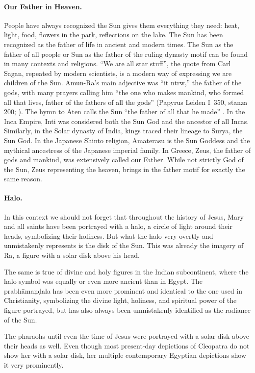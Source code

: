\paragraph{Our Father in Heaven.}
People have always recognized the Sun gives them everything they need: heat, light, food, flowers in the park, reflections on the lake.
The Sun has been recognized as the father of life in ancient and modern times.
The Sun as the father of all people or Sun as the father of the ruling dynasty motif can be found in many contexts and religions.
``We are all star stuff'', the quote from Carl Sagan, repeated by modern scientists, is a modern way of expressing we are children of the Sun.
Amun-Ra's main adjective was ``it nṯrw,'' the father of the gods, with many prayers calling him ``the one who makes mankind, who formed all that lives, father of the fathers of all the gods'' (Papyrus Leiden I~350, stanza 200; \cite{assmann:searchgod}).
The hymn to Aten calls the Sun ``the father of all that he made'' \cite{hymn:aten}.
In the Inca Empire, Inti was considered both the Sun God and the ancestor of all Incas.
Similarly, in the Solar dynasty of India, kings traced their lineage to Surya, the Sun God.
In the Japanese Shinto religion, Amaterasu is the Sun Goddess and the mythical ancestress of the Japanese imperial family.
In Greece, Zeus, the father of gods and mankind, was extensively called our Father.
While not strictly God of the Sun, Zeus representing the heaven, brings in the father motif for exactly the same reason.

\paragraph{Halo.}
In this context we should not forget that throughout the history of Jesus, Mary and all saints have been portrayed with a halo, a circle of light around their heads, symbolizing their holiness.
But what the halo very overtly and unmistakenly represents is the disk of the Sun.
This was already the imagery of Ra, a figure with a solar disk above his head.

The same is true of divine and holy figures in the Indian subcontinent, where the halo symbol was equally or even more ancient than in Egypt.
The prabhāmaṇḍala has been even more prominent and identical to the one used in Christianity, symbolizing the divine light, holiness, and spiritual power of the figure portrayed, but has also always been unmistakenly identified as the radiance of the Sun.

The pharaohs until even the time of Jesus were portrayed with a solar disk above their heads as well.
Even though most present-day depictions of Cleopatra do not show her with a solar disk, her multiple contemporary Egyptian depictions show it very prominently.

